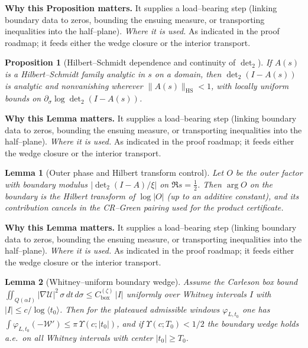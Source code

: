 \documentclass[11pt]{article}
\newtheorem{proposition}{Proposition}[section]
\newtheorem{lemma}{Lemma}[section]
\theoremstyle{definition}
\theoremstyle{remark}
\providecommand{\Cbox}{C^{(\zeta)}_{\mathrm{box}}}
\begin{document}
\noindent\textbf{Why this Proposition matters.} It supplies a load--bearing step (linking boundary data to zeros, bounding the ensuing measure, or transporting inequalities into the half--plane).
\noindent\textit{Where it is used.} As indicated in the proof roadmap; it feeds either the wedge closure or the interior transport.
\begin{proposition}[Hilbert--Schmidt dependence and continuity of $\det_2$]\label{prop:hs-det2-continuity}
If $A(s)$ is a Hilbert--Schmidt family analytic in $s$ on a domain, then $\det\nolimits_2(I-A(s))$ is analytic and nonvanishing wherever $\|A(s)\|_{\mathrm{HS}}<1$, with locally uniform bounds on $\partial_\sigma \log\det\nolimits_2(I-A(s))$.
\end{proposition}

\noindent\textbf{Why this Lemma matters.} It supplies a load--bearing step (linking boundary data to zeros, bounding the ensuing measure, or transporting inequalities into the half--plane).
\noindent\textit{Where it is used.} As indicated in the proof roadmap; it feeds either the wedge closure or the interior transport.
\begin{lemma}[Outer phase and Hilbert transform control]\label{lem:outer-phase-HT}
Let $O$ be the outer factor with boundary modulus $|\det\nolimits_2(I-A)/\xi|$ on $\Re s=\tfrac12$. Then $\arg O$ on the boundary is the Hilbert transform of $\log|O|$ (up to an additive constant), and its contribution cancels in the CR--Green pairing used for the product certificate.
\end{lemma}

\noindent\textbf{Why this Lemma matters.} It supplies a load--bearing step (linking boundary data to zeros, bounding the ensuing measure, or transporting inequalities into the half--plane).
\noindent\textit{Where it is used.} As indicated in the proof roadmap; it feeds either the wedge closure or the interior transport.
\begin{lemma}[Whitney--uniform boundary wedge]\label{lem:whitney-uniform-wedge}
Assume the Carleson box bound $\iint_{Q(\alpha I)} |\nabla \mathcal U|^2\,\sigma\,dt\,d\sigma \le \Cbox\,|I|$ uniformly over Whitney intervals $I$ with $|I|\le c/\log\langle t_0\rangle$.
Then for the plateaued admissible windows $\varphi_{L,t_0}$ one has $\int \varphi_{L,t_0}(-\mathcal W')\le \pi\,\Upsilon(c;|t_0|)$, and if $\Upsilon(c;T_0)<1/2$ the boundary wedge holds a.e.\ on all Whitney intervals with center $|t_0|\ge T_0$.
\end{lemma}
\end{document}
